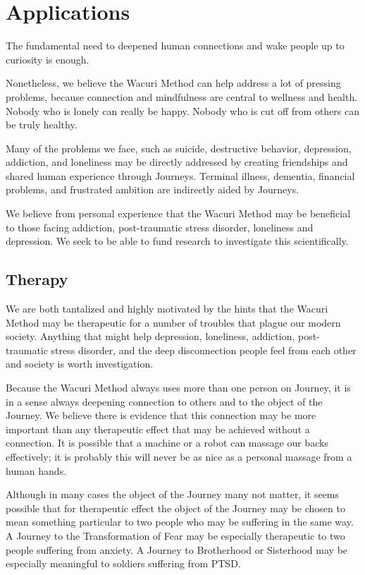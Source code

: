 \documentclass[12pt]{book}
\begin{document}
\chapter{Applications}

The fundamental need to deepened human connections and wake people up
to curiosity is enough.

Nonetheless, we believe the Wacuri Method can help address a lot of
pressing problems, because connection and mindfulness are central to
wellness and health. Nobody who is lonely can really be happy. Nobody
who is cut off from others can be truly healthy.

Many of the problems we face, such as suicide, destructive behavior,
depression, addiction, and loneliness may be directly addressed by
creating friendships and shared human experience through
Journeys. Terminal illness, dementia, financial problems, and
frustrated ambition are indirectly aided by Journeys.

We believe from personal experience that the Wacuri Method may be
beneficial to those facing addiction, post-traumatic stress disorder,
loneliness and depression.  We seek to be able to fund research to
investigate this scientifically.

\section{Therapy}

We are both tantalized and highly motivated by the hints that the
Wacuri Method may be therapeutic for a number of troubles that plague
our modern society. Anything that might help depression, loneliness,
addiction, post-traumatic stress disorder, and the deep disconnection
people feel from each other and society is worth investigation.

Because the Wacuri Method always uses more than one person on Journey,
it is in a sense always deepening connection to others and to the
object of the Journey. We believe there is evidence that this
connection may be more important than any therapeutic effect that may
be achieved without a connection. It is possible that a machine or a
robot can massage our backs effectively; it is probably this will
never be as nice as a personal massage from a human hands.

Although in many cases the object of the Journey many not matter, it
seems possible that for therapeutic effect the object of the Journey
may be chosen to mean something particular to two people who may be
suffering in the same way. A Journey to the Transformation of Fear may
be especially therapeutic to two people suffering from anxiety. A
Journey to Brotherhood or Sisterhood may be especially meaningful to
soldiers suffering from PTSD.
\end{document}
